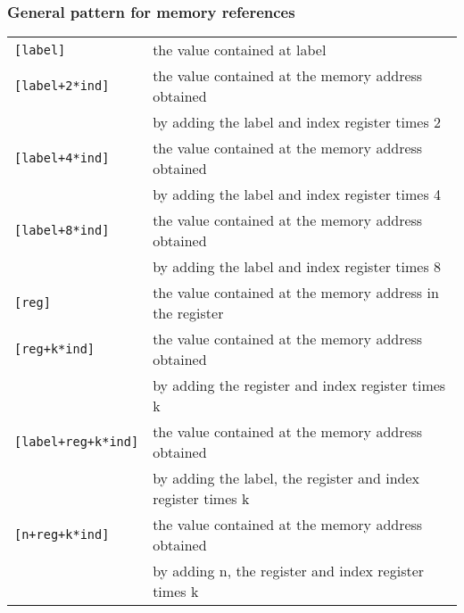 \documentclass{beamer}
\begin{document}
\begin{frame}[fragile]
    \frametitle{General pattern for memory references}
\small
\begin{tabular}{ll}
 {\tt [label]} & the value contained at label\\
 {\tt [label+2*ind]} & the value contained at the memory address obtained \\
                     & by adding the label and index register times 2\\
 {\tt [label+4*ind]} & the value contained at the memory address obtained \\
                     & by adding the label and index register times 4\\
 {\tt [label+8*ind]} & the value contained at the memory address obtained \\
                     & by adding the label and index register times 8\\
 {\tt [reg]} &   the value contained at the memory address in the register\\
 {\tt [reg+k*ind]} & the value contained at the memory address obtained \\
                     & by adding the register and index register times k\\
 {\tt [label+reg+k*ind]} & the value contained at the memory address obtained \\
                     & by adding the label, the register and index register times k\\
 {\tt [n+reg+k*ind]} & the value contained at the memory address obtained \\
                     & by adding n, the register and index register times k
\end{tabular}
\end{frame}
\end{document}
